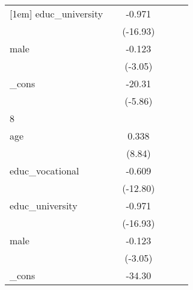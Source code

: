 {\begin{tabular}{l*{5}{c}}
[1em]
educ\_university&                     &      -0.971\sym{***}&                     &                     &                     \\
            &                     &    (-16.93)         &                     &                     &                     \\
[1em]
male        &                     &      -0.123\sym{**} &                     &                     &                     \\
            &                     &     (-3.05)         &                     &                     &                     \\
[1em]
\_cons      &                     &      -20.31\sym{***}&                     &                     &                     \\
            &                     &     (-5.86)         &                     &                     &                     \\
\hline
8           &                     &                     &                     &                     &                     \\
age         &                     &       0.338\sym{***}&                     &                     &                     \\
            &                     &      (8.84)         &                     &                     &                     \\
[1em]
educ\_vocational&                     &      -0.609\sym{***}&                     &                     &                     \\
            &                     &    (-12.80)         &                     &                     &                     \\
[1em]
educ\_university&                     &      -0.971\sym{***}&                     &                     &                     \\
            &                     &    (-16.93)         &                     &                     &                     \\
[1em]
male        &                     &      -0.123\sym{**} &                     &                     &                     \\
            &                     &     (-3.05)         &                     &                     &                     \\
[1em]
\_cons      &                     &      -34.30\sym{***}&                     &                     &                     \\

\end{tabular}}
